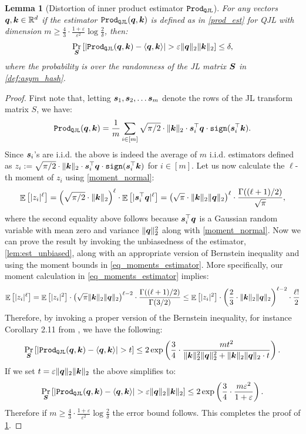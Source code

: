 \documentclass[11pt]{article}
\theoremstyle{plain}
\newtheorem{lemma}[theorem]{Lemma}
\theoremstyle{definition}
\theoremstyle{remark}
\newcommand{\prodqjl}{\operatorname{{\tt Prod_{QJL}}}}
\begin{document}
\begin{lemma}[Distortion of inner product estimator $\prodqjl$]\label{lem_distortion_inner_prod_est}
    For any vectors $\q, \k 
    \in \RR^d$ if the estimator $\prodqjl(\q, \k)$ is defined as in \cref{prod_est} for QJL with dimension $m \ge \frac{4}{3} \cdot \frac{1 + \varepsilon}{\varepsilon^2}\log \frac{2}{\delta}$, then:
    \[
    \Pr_{\S} \left[ \left| \prodqjl(\q, \k) - \langle \q, \k \rangle \right| > \varepsilon \|\q\|_2\|\k\|_2 \right] \le \delta,
    \]
    where the probability is over the randomness of the JL matrix $\S$ in \cref{def:asym_hash}.
\end{lemma}
\begin{proof}
    First note that, letting $\s_1, \s_2, \ldots \s_m$ denote the rows of the JL transform matrix $S$, we have:
    \[
    \prodqjl(\q, \k) = \frac{1}{m} \sum_{i\in[m]} \sqrt{\pi/2} \cdot \| \k \|_2 \cdot \s_i^\top \q \cdot {\tt sign}(\s_i^\top \k).
    \]
    Since $\s_i$'s are i.i.d. the above is indeed the average of $m$ i.i.d. estimators defined as $z_i := \sqrt{\pi/2} \cdot \| \k \|_2 \cdot \s_i^\top \q \cdot {\tt sign}(\s_i^\top \k)$ for $i \in [m]$.
    Let us now calculate the $\ell$-th moment of $z_i$ using \cref{moment_normal}:
    \begin{equation}\label{eq_moments_estimator}
    \E \left[ |z_i|^\ell \right] = \left(\sqrt{\pi/2} \cdot \| \k \|_2\right)^\ell \cdot \E \left[ |\s_i^\top \q|^\ell \right] = \left(\sqrt{\pi} \cdot \| \k \|_2 \| \q \|_2 \right)^\ell \cdot \frac{\Gamma((\ell+1)/2)}{\sqrt{\pi}},
    \end{equation}
    where the second equality above follows because $\s_i^\top \q$ is a Gaussian random variable with mean zero and variance $\|\q\|_2^2$ along with \cref{moment_normal}.
    Now we can prove the result by invoking the unbiasedness of the estimator, \cref{lem:est_unbiased}, along with an appropriate version of Bernstein inequality and using the moment bounds in \cref{eq_moments_estimator}. 
    More specifically, our moment calculation in \cref{eq_moments_estimator} implies:
    \[
    \E \left[ |z_i|^\ell \right] = \E \left[ |z_i|^2 \right] \cdot \left(\sqrt{\pi} \| \k \|_2 \| \q \|_2 \right)^{\ell-2} \cdot \frac{\Gamma((\ell+1)/2)}{\Gamma(3/2)} \le \E \left[ |z_i|^2 \right] \cdot \left( \frac{2}{3} \cdot \| \k \|_2 \| \q \|_2 \right)^{\ell-2} \cdot \frac{\ell!}{2}
    \]
    Therefore, by invoking a proper version of the Bernstein inequality, for instance Corollary 2.11 from \cite{boucheron2003concentration}, we have the following:
    \[
    \Pr_{\S} \left[ \left| \prodqjl(\q, \k) - \langle \q, \k \rangle \right| > t \right] \le 2\exp\left( \frac{3}{4} \cdot \frac{m t^2}{ \| \k \|_2^2 \| \q \|_2^2  + \| \k \|_2 \| \q \|_2 \cdot t } \right).
    \]
    If we set $t = \varepsilon \|\q\|_2\|\k\|_2$ the above simplifies to:
    \[
    \Pr_{\S} \left[ \left| \prodqjl(\q, \k) - \langle \q, \k \rangle \right| > \varepsilon \|\q\|_2\|\k\|_2 \right] \le 2\exp\left( \frac{3}{4} \cdot \frac{m \varepsilon^2}{1 + \varepsilon} \right).
    \]
    Therefore if $m \ge \frac{4}{3} \cdot 
 \frac{1 + \varepsilon}{\varepsilon^2}\log \frac{2}{\delta}$ the error bound follows.
 This completes the proof of \cref{lem_distortion_inner_prod_est}.
\end{proof}
\end{document}
